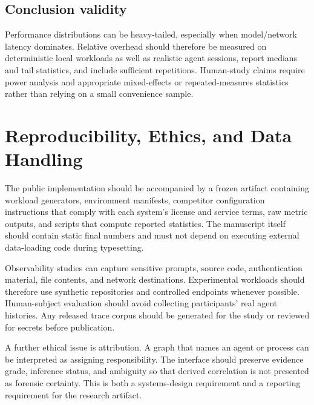 \subsection{Conclusion validity}
Performance distributions can be heavy-tailed, especially when model/network latency dominates. Relative overhead should therefore be measured on deterministic local workloads as well as realistic agent sessions, report medians and tail statistics, and include sufficient repetitions. Human-study claims require power analysis and appropriate mixed-effects or repeated-measures statistics rather than relying on a small convenience sample.

\section{Reproducibility, Ethics, and Data Handling}
The public implementation should be accompanied by a frozen artifact containing workload generators, environment manifests, competitor configuration instructions that comply with each system's license and service terms, raw metric outputs, and scripts that compute reported statistics. The manuscript itself should contain static final numbers and must not depend on executing external data-loading code during typesetting.

Observability studies can capture sensitive prompts, source code, authentication material, file contents, and network destinations. Experimental workloads should therefore use synthetic repositories and controlled endpoints whenever possible. Human-subject evaluation should avoid collecting participants' real agent histories. Any released trace corpus should be generated for the study or reviewed for secrets before publication.

A further ethical issue is attribution. A graph that names an agent or process can be interpreted as assigning responsibility. The interface should preserve evidence grade, inference status, and ambiguity so that derived correlation is not presented as forensic certainty. This is both a systems-design requirement and a reporting requirement for the research artifact.

